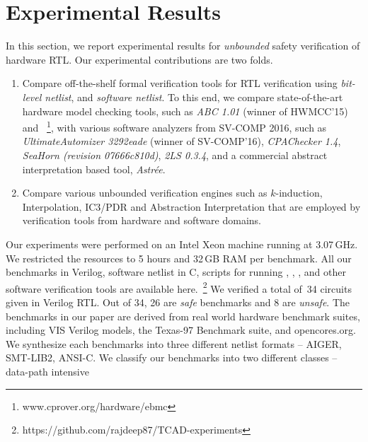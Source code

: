 \section{Experimental Results}
In this section, we report experimental results for \emph{unbounded} safety 
verification of hardware RTL.  Our experimental contributions are two folds.
%
\begin{enumerate}
  \item Compare off-the-shelf formal verification tools for RTL verification
    using \emph{bit-level netlist}, and \emph{software netlist}.  
    To this end, we compare state-of-the-art hardware model checking tools, such as 
    \emph{ABC 1.01} (winner of HWMCC'15) and 
    \ebmcv~\footnote{\scriptsize{www.cprover.org/hardware/ebmc}}, 
    with various software analyzers from SV-COMP 2016, such as 
    \emph{UltimateAutomizer 3292eade} (winner of SV-COMP'16), 
    \emph{CPAChecker 1.4}, 
    \emph{SeaHorn (revision 07666c810d)}, \emph{2LS 0.3.4}, 
    and a commercial abstract 
    interpretation based tool, \emph{Astr{\'e}e}.  
  
 \item  Compare various unbounded verification engines such as $k$-induction, 
    Interpolation, IC3/PDR and Abstraction Interpretation that are employed by 
    verification tools from hardware and software domains.
\end{enumerate}
%
Our experiments were performed on an Intel Xeon machine running at
3.07\,GHz.  We restricted the resources to 5 hours and 32\,GB RAM per
benchmark.  All our benchmarks in Verilog, software netlist in C, 
scripts for running \yosys, \ABC, \ebmcv, and other software 
verification tools are available here.~\footnote{\scriptsize{https://github.com/rajdeep87/TCAD-experiments}}
%
%
We verified a total of~34 circuits given in Verilog RTL.  Out of 34, 26 
are \emph{safe} benchmarks and 8 are \emph{unsafe}.  The benchmarks in 
our paper are derived from real world hardware benchmark suites, including 
VIS Verilog models, the Texas-97 Benchmark suite, and opencores.org. We synthesize 
each benchmarks into three different netlist formats -- AIGER, SMT-LIB2, ANSI-C.
We classify our benchmarks into two different classes -- data-path intensive
